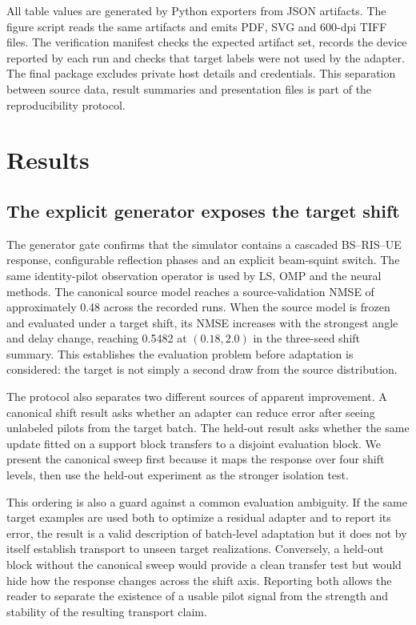 \documentclass[10pt,twocolumn]{article}
\begin{document}
All table values are generated by Python exporters from JSON artifacts. The figure script reads the same artifacts and emits PDF, SVG and 600-dpi TIFF files. The verification manifest checks the expected artifact set, records the device reported by each run and checks that target labels were not used by the adapter. The final package excludes private host details and credentials. This separation between source data, result summaries and presentation files is part of the reproducibility protocol.

\section{Results}

\subsection{The explicit generator exposes the target shift}

The generator gate confirms that the simulator contains a cascaded BS--RIS--UE response, configurable reflection phases and an explicit beam-squint switch. The same identity-pilot observation operator is used by LS, OMP and the neural methods. The canonical source model reaches a source-validation NMSE of approximately 0.48 across the recorded runs. When the source model is frozen and evaluated under a target shift, its NMSE increases with the strongest angle and delay change, reaching 0.5482 at $(0.18,2.0)$ in the three-seed shift summary. This establishes the evaluation problem before adaptation is considered: the target is not simply a second draw from the source distribution.

The protocol also separates two different sources of apparent improvement. A canonical shift result asks whether an adapter can reduce error after seeing unlabeled pilots from the target batch. The held-out result asks whether the same update fitted on a support block transfers to a disjoint evaluation block. We present the canonical sweep first because it maps the response over four shift levels, then use the held-out experiment as the stronger isolation test.

This ordering is also a guard against a common evaluation ambiguity. If the same target examples are used both to optimize a residual adapter and to report its error, the result is a valid description of batch-level adaptation but it does not by itself establish transport to unseen target realizations. Conversely, a held-out block without the canonical sweep would provide a clean transfer test but would hide how the response changes across the shift axis. Reporting both allows the reader to separate the existence of a usable pilot signal from the strength and stability of the resulting transport claim.
\end{document}
